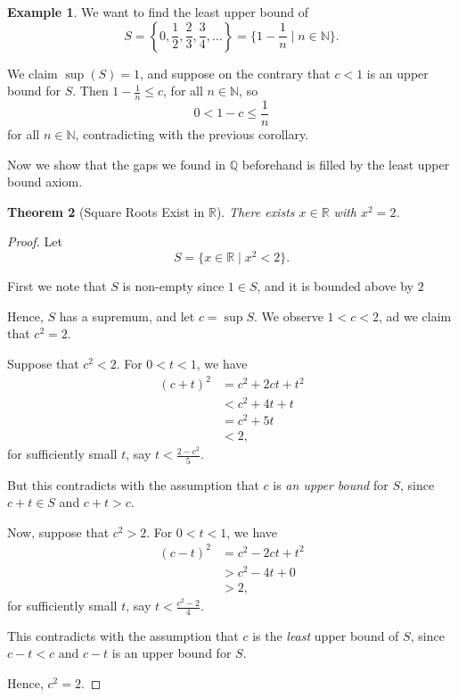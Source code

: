\documentclass{article}
\newtheorem{theorem}{Theorem}[section]
\theoremstyle{definition}
\newtheorem{example}[theorem]{Example}
\theoremstyle{remark}
\newcommand{\pqty}[1]{\left(#1\right)}
\newcommand{\Bqty}[1]{\left\{#1\right\}}
\newcommand{\set}[2]{\{#1\mid #2\}}
\newcommand{\NN}{\mathbb{N}}
\newcommand{\QQ}{\mathbb{Q}}
\newcommand{\RR}{\mathbb{R}}
\begin{document}
\begin{example}
    We want to find the least upper bound of
    \[
        S = \Bqty{0, \frac{1}{2}, \frac{2}{3}, \frac{3}{4}, \ldots} = \set{1 - \frac{1}{n}}{n \in \NN}.
    \]

    We claim \(\sup \pqty{S} = 1\), and suppose on the contrary that \(c < 1\) is an upper bound for \(S\). Then \(1 - \frac{1}{n} \leq c\), for all \(n \in \NN\), so
    \[
        0 < 1 - c \leq \frac{1}{n}
    \]
    for all \(n \in \NN\), contradicting with the previous corollary.
\end{example}

Now we show that the gaps we found in \(\QQ\) beforehand is filled by the least upper bound axiom.

\begin{theorem}[Square Roots Exist in \(\RR\)]
    There exists \(x \in \RR\) with \(x^2 = 2\).
\end{theorem}

\begin{proof}
    Let
    \[
        S = \set{x \in \RR}{x^2 < 2}.
    \]

    First we note that \(S\) is non-empty since \(1 \in S\), and it is bounded above by \(2\)

    Hence, \(S\) has a supremum, and let \(c = \sup S\). We observe \(1 < c < 2\), ad we claim that \(c^2 = 2\).

    Suppose that \(c^2 < 2\). For \(0 < t < 1\), we have
    \begin{align*}
        \pqty{c + t}^2 &= c^2 + 2ct + t^2 \\
        &< c^2 + 4t + t \\
        &= c^2 + 5t \\
        &< 2,
    \end{align*}
    for sufficiently small \(t\), say \(t < \frac{2 - c^2}{5}\).

    But this contradicts with the assumption that \(c\) is \emph{an upper bound} for \(S\), since \(c + t \in S\) and \(c + t > c\).

    Now, suppose that \(c^2 > 2\). For \(0 < t < 1\), we have
    \begin{align*}
        \pqty{c - t}^2 &= c^2 - 2ct + t^2 \\
        &> c^2 - 4t + 0 \\
        &> 2,
    \end{align*}
    for sufficiently small \(t\), say \(t < \frac{c^2 - 2}{4}\).

    This contradicts with the assumption that \(c\) is the \emph{least} upper bound of \(S\), since \(c - t < c\) and \(c - t\) is an upper bound for \(S\).

    Hence, \(c^2 = 2\).
\end{proof}
\end{document}
